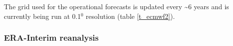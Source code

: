The grid used for the operational forecasts is updated every \textasciitilde{6} years and is currently being run at 0.1$^0$ resolution (table \ref{t_ecmwf2}).
%
%
%
%
%
%
%
%

\subsubsection {ERA-Interim reanalysis}  \label{ECMWF_ERA}
 

